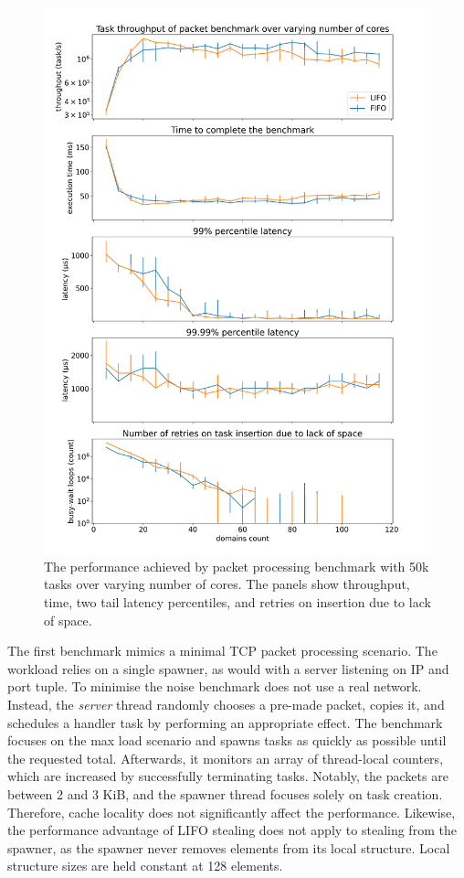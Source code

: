 \documentclass[12pt,a4paper,twoside]{report}
\begin{document}
\begin{figure}
     \centering
     \includegraphics[width=1\textwidth]{eval/packet-basic-with-steal-counts2std-bigger_fonts.png}
     \caption{The performance achieved by packet processing benchmark with 50k tasks over varying number of cores. The panels show throughput, time, two tail latency percentiles, and retries on insertion due to lack of space.}
    \label{fig:packet-50k}
\end{figure}

The first benchmark mimics a minimal TCP packet processing scenario. The workload relies on a single spawner, as would with a server listening on IP and port tuple. To minimise the noise benchmark does not use a real network. Instead, the \textit{server} thread randomly chooses a pre-made packet, copies it, and schedules a handler task by performing an appropriate effect. The benchmark focuses on the max load scenario and spawns tasks as quickly as possible until the requested total. Afterwards, it monitors an array of thread-local counters, which are increased by successfully terminating tasks. Notably, the packets are between 2 and 3 KiB, and the spawner thread focuses solely on task creation. Therefore, cache locality does not significantly affect the performance. Likewise, the performance advantage of LIFO stealing does not apply to stealing from the spawner, as the spawner never removes elements from its local structure. Local structure sizes are held constant at 128 elements.
\end{document}
